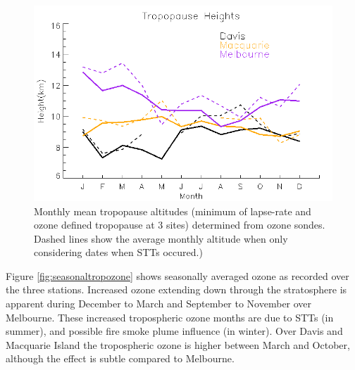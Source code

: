 \documentclass{article}
\begin{document}
    \begin{figure}[!htbp]
	\begin{center}
	\includegraphics[width=0.8\columnwidth]{figures/tpheights}
	\caption{Monthly mean tropopause altitudes (minimum of lapse-rate and ozone defined tropopause at 3 sites) determined from ozone sondes.
	Dashed lines show the average monthly altitude when only considering dates when STTs occured.) 
	}
	\label{fig:seasonaltpheights}
	\end{center}
    \end{figure}

    Figure \ref{fig:seasonaltropozone} shows seasonally averaged ozone as recorded over the three stations.
    Increased ozone extending down through the stratosphere is apparent during December to March and September to November over Melbourne.
    These increased tropospheric ozone months are due to STTs (in summer), and possible fire smoke plume influence (in winter).
    Over Davis and Macquarie Island the tropospheric ozone is higher between March and October, although the effect is subtle compared to Melbourne.
    
\end{document}
